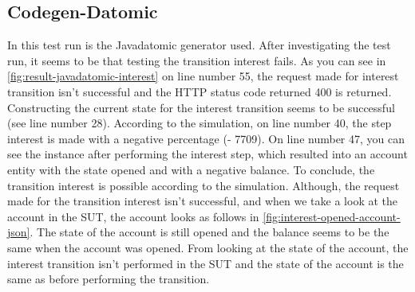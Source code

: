 \subsection{Codegen-Datomic}
\label{sec:bug-interest-javadatomic}
In this test run is the Javadatomic generator used. After investigating the test run, it seems to be that testing the transition interest fails. As you can see in \autoref{fig:result-javadatomic-interest} on line number 55, the request made for interest transition isn't successful and the HTTP status code returned 400 is returned. Constructing the current state for the interest transition seems to be successful (see line number 28). According to the simulation, on line number 40, the step interest is made with a negative percentage (- 7709). On line number 47, you can see the instance after performing the interest step, which resulted into an account entity with the state opened and with a negative balance. To conclude, the transition interest is possible according to the simulation. Although, the request made for the transition interest isn't successful, and when we take a look at the account in the SUT, the account looks as follows in \autoref{fig:interest-opened-account-json}. The state of the account is still opened and the balance seems to be the same when the account was opened. From looking at the state of the account, the interest transition isn't performed in the SUT and the state of the account is the same as before performing the transition.


